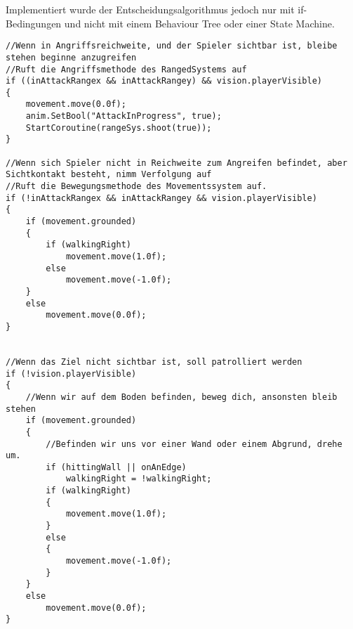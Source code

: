 Implementiert wurde der Entscheidungsalgorithmus jedoch nur mit if-Bedingungen und nicht mit einem Behaviour Tree oder einer State Machine.

\begin{lstlisting}[breaklines=true]
//Wenn in Angriffsreichweite, und der Spieler sichtbar ist, bleibe stehen beginne anzugreifen
//Ruft die Angriffsmethode des RangedSystems auf
if ((inAttackRangex && inAttackRangey) && vision.playerVisible)
{
	movement.move(0.0f);
	anim.SetBool("AttackInProgress", true);
	StartCoroutine(rangeSys.shoot(true));
}

//Wenn sich Spieler nicht in Reichweite zum Angreifen befindet, aber Sichtkontakt besteht, nimm Verfolgung auf
//Ruft die Bewegungsmethode des Movementssystem auf.
if (!inAttackRangex && inAttackRangey && vision.playerVisible)
{
	if (movement.grounded)
	{
		if (walkingRight)
			movement.move(1.0f);
		else
			movement.move(-1.0f);
	}
	else
		movement.move(0.0f);
}


//Wenn das Ziel nicht sichtbar ist, soll patrolliert werden
if (!vision.playerVisible)
{
	//Wenn wir auf dem Boden befinden, beweg dich, ansonsten bleib stehen
	if (movement.grounded)
	{
		//Befinden wir uns vor einer Wand oder einem Abgrund, drehe um.
		if (hittingWall || onAnEdge)
			walkingRight = !walkingRight;
		if (walkingRight)
		{
			movement.move(1.0f);
		}
		else
		{
			movement.move(-1.0f);
		}
	}
	else
		movement.move(0.0f);
}
\end{lstlisting}